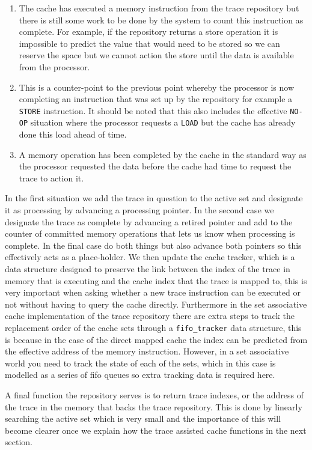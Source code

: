 \begin{enumerate}
	\item The cache has executed a memory instruction from the trace repository but there is still some work to be done by the system to count this instruction as complete. For example, if the repository returns a store operation it is impossible to predict the value that would need to be stored so we can reserve the space but we cannot action the store until the data is available from the processor.
	\item This is a counter-point to the previous point whereby the processor is now completing an instruction that was set up by the repository for example a \texttt{STORE} instruction. It should be noted that this also includes the effective \texttt{NO-OP} situation where the processor requests a \texttt{LOAD} but the cache has already done this load ahead of time. 
	\item A memory operation has been completed by the cache in the standard way as the processor requested the data before the cache had time to request the trace to action it.
\end{enumerate} 

In the first situation we add the trace in question to the active set and designate it as processing by advancing a processing pointer. In the second case we designate the trace as complete by advancing a retired pointer and add to the counter of committed memory operations that lets us know when processing is complete. In the final case do both things but also advance both pointers so this effectively acts as a place-holder. We then update the cache tracker, which is a data structure designed to preserve the link between the index of the trace in memory that is executing and the cache index that the trace is mapped to, this is very important when asking whether a new trace instruction can be executed or not without having to query the cache directly. Furthermore in the set associative cache implementation of the trace repository there are extra steps to track the replacement order of the cache sets through a \texttt{fifo\_tracker} data structure, this is because in the case of the direct mapped cache the index can be predicted from the effective address of the memory instruction. However, in a set associative world you need to track the state of each of the sets, which in this case is modelled as a series of \gls{fifo} queues so extra tracking data is required here.

A final function the repository serves is to return trace indexes, or the address of the trace in the memory that backs the trace repository. This is done by linearly searching the active set which is very small and the importance of this will become clearer once we explain how the trace assisted cache functions in the next section.

